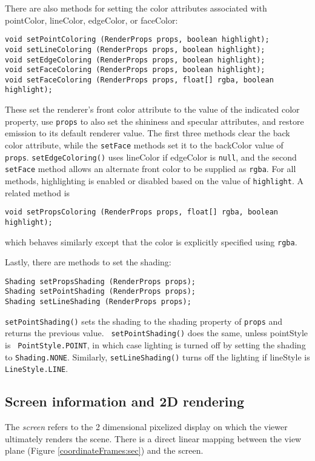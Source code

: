 There are also methods for setting the color attributes associated
with {\sf pointColor}, {\sf lineColor}, {\sf edgeColor}, or
{\sf faceColor}:
%
\begin{lstlisting}[]
void setPointColoring (RenderProps props, boolean highlight);
void setLineColoring (RenderProps props, boolean highlight);
void setEdgeColoring (RenderProps props, boolean highlight);
void setFaceColoring (RenderProps props, boolean highlight);
void setFaceColoring (RenderProps props, float[] rgba, boolean highlight);
\end{lstlisting}
%
These set the renderer's front color attribute to the value of the
indicated color property, use {\tt props} to also set the shininess
and specular attributes, and restore emission to its default renderer
value. The first three methods clear the back color attribute, while
the {\tt setFace} methods set it to the {\sf backColor} value of {\tt
props}. {\tt setEdgeColoring()} uses {\sf lineColor} if {\sf
edgeColor} is {\tt null}, and the second {\tt setFace} method allows
an alternate front color to be supplied as {\tt rgba}. For all
methods, highlighting is enabled or disabled based on the value of
{\tt highlight}.  A related method is
%
\begin{lstlisting}[]
void setPropsColoring (RenderProps props, float[] rgba, boolean highlight);
\end{lstlisting}
%
which behaves similarly except that the color is explicitly specified
using {\tt rgba}.

Lastly, there are methods to set the shading:
%
\begin{lstlisting}[]
Shading setPropsShading (RenderProps props);
Shading setPointShading (RenderProps props);
Shading setLineShading (RenderProps props);
\end{lstlisting}
%
{\tt setPointShading()} sets the shading to the {\sf shading} property
of {\tt props} and returns the previous value.  {\tt
setPointShading()} does the same, unless {\sf pointStyle} is {\tt
PointStyle.POINT}, in which case lighting is turned off by setting the
shading to {\tt Shading.NONE}.  Similarly, {\tt setLineShading()}
turns off the lighting if {\sf lineStyle} is {\tt LineStyle.LINE}.

\subsection{Screen information and 2D rendering}

The {\it screen} refers to the 2 dimensional pixelized display on
which the viewer ultimately renders the scene. There is a direct
linear mapping between the view plane (Figure
\ref{coordinateFrames:sec}) and the screen.

